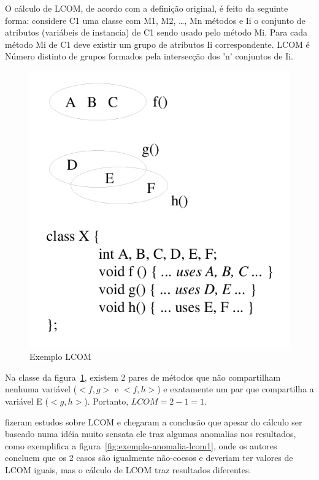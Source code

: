 O cálculo de LCOM, de acordo com a definição original, é feito da seguinte
forma: considere C1 uma classe com M1, M2, \ldots, Mn métodos e Ii o conjunto
de atributos (variábeis de instancia) de C1 sendo usado pelo método Mi. Para
cada método Mi de C1 deve existir um grupo de atributos Ii correspondente. LCOM
é Número distinto de grupos formados pela intersecção dos 'n' conjuntos de Ii.

\begin{figure}[h]
\center
\includegraphics[scale=0.4]{imagens/exemplo-lcom1-hitz-e-montazeri}
\caption{Exemplo LCOM \cite{measuringCouplingAndCohesion}}
\label{fig:exemplo-lcom1}
\end{figure}

Na classe da figura~\ref{fig:exemplo-lcom1}, existem 2 pares de
métodos que não compartilham nenhuma variável ($<f, g>$ e $<f, h>$) e
exatamente um par que compartilha a variável E ($<g, h>$). Portanto, $LCOM = 2
- 1 = 1$.

 fizeram estudos sobre
LCOM e chegaram a conclusão que apesar do cálculo ser baseado numa idéia
muito sensata ele traz algumas anomalias nos resultados, como exemplifica a
figura~\ref{fig:exemplo-anomalia-lcom1}, onde os autores concluem que os 2
casos são igualmente não-coesos e deveriam ter valores de LCOM iguais, mas
o cálculo de LCOM traz resultados diferentes.

